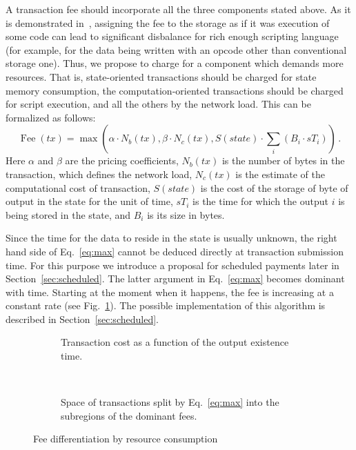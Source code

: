 \documentclass[]{llncs}   %
\begin{document}
A transaction fee should incorporate all the three components stated above.  As
it is demonstrated in~\cite{Earlz2017}, assigning the fee to the storage as if
it was execution of some code can lead to significant disbalance for rich enough
scripting language (for example, for the data being written with an opcode other
than conventional storage one).  Thus, we propose to charge for a component
which demands more resources. That is, state-oriented transactions should be
charged for state memory consumption, the computation-oriented transactions
should be charged for script execution, and all the others by the network load.
This can be formalized as follows:
\begin{equation}
    \operatorname{Fee}(tx) = \max\left(\alpha \cdot N_b(tx), \beta \cdot N_c(tx),
    S(state) \cdot \sum_i (B_i \cdot sT_i) \right)\,.
    \label{eq:max}
\end{equation}
Here $\alpha$ and $\beta$ are the pricing coefficients, $N_b(tx)$ is the number
of bytes in the transaction, which defines the network load, $N_c(tx)$ is the
estimate of the computational cost of transaction, $S(state)$ is the cost of the
storage of byte of output in the state for the unit of time, $sT_i$ is the time
for which the output $i$ is being stored in the state, and $B_i$ is its size in
bytes.

Since the time for the data to reside in the state is usually unknown,
the right hand side of Eq.~\eqref{eq:max} cannot be deduced directly at
transaction submission time. For this purpose we introduce a proposal for 
scheduled payments later in Section~\ref{sec:scheduled}. The latter
argument in Eq.~\eqref{eq:max} becomes dominant with time. Starting at the moment when it happens, the
fee is increasing at a constant rate (see Fig.~\ref{fig:max_t}). The possible implementation of this 
algorithm is described in Section~\ref{sec:scheduled}.
\begin{figure}
    \centering
    \begin{subfigure}[b]{.45\textwidth}
    
    \caption{Transaction cost as a function of the output existence time.
        \newline
        \label{fig:max_t}}
    \end{subfigure}
    ~
    \begin{subfigure}[b]{.45\textwidth}
        
        \caption{Space of transactions split by
            Eq.~\eqref{eq:max} into the subregions of the dominant fees.
            \label{fig:max}}
        \end{subfigure}
        \caption{Fee differentiation by resource consumption}
\end{figure}
\end{document}

